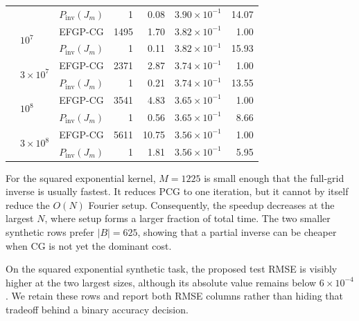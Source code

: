 \begin{table}[H]
\begin{tabular}{lllrrrr}
& & \(P_{\mathrm{inv}}(J_m)\) & 1 & 0.08 & \(3.90{\times}10^{-1}\) & 14.07 \\
& \multirow{2}{*}{\(10^7\)} & EFGP-CG & 1495 & 1.70 & \(3.82{\times}10^{-1}\) & 1.00 \\
& & \(P_{\mathrm{inv}}(J_m)\) & 1 & 0.11 & \(3.82{\times}10^{-1}\) & 15.93 \\
& \multirow{2}{*}{\(3{\times}10^7\)} & EFGP-CG & 2371 & 2.87 & \(3.74{\times}10^{-1}\) & 1.00 \\
& & \(P_{\mathrm{inv}}(J_m)\) & 1 & 0.21 & \(3.74{\times}10^{-1}\) & 13.55 \\
& \multirow{2}{*}{\(10^8\)} & EFGP-CG & 3541 & 4.83 & \(3.65{\times}10^{-1}\) & 1.00 \\
& & \(P_{\mathrm{inv}}(J_m)\) & 1 & 0.56 & \(3.65{\times}10^{-1}\) & 8.66 \\
& \multirow{2}{*}{\(3{\times}10^8\)} & EFGP-CG & 5611 & 10.75 & \(3.56{\times}10^{-1}\) & 1.00 \\
& & \(P_{\mathrm{inv}}(J_m)\) & 1 & 1.81 & \(3.56{\times}10^{-1}\) & 5.95 \\
\bottomrule
\end{tabular}
\end{table}

For the squared exponential kernel, \(M=1225\) is small enough that the
full-grid inverse is usually fastest. It reduces PCG to one iteration, but it
cannot by itself reduce the \(O(N)\) Fourier setup. Consequently, the speedup
decreases at the largest \(N\), where setup forms a larger fraction of total
time. The two smaller synthetic rows prefer \(|B|=625\), showing that a partial
inverse can be cheaper when CG is not yet the dominant cost.

On the squared exponential synthetic task, the proposed test RMSE is visibly
higher at the two largest sizes, although its absolute value remains below
\(6\times10^{-4}\).  We retain these rows and report both RMSE columns rather
than hiding that tradeoff behind a binary accuracy decision.

